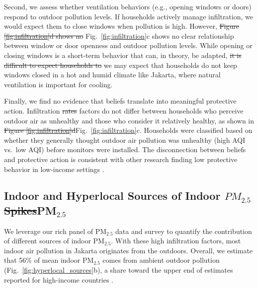 \documentclass[reqno,12pt,notitlepage]{article}
\providecommand{\DIFadd}[1]{{\protect\color{BLUE}#1}} %
\providecommand{\DIFdel}[1]{{\protect\color{red}\sout{#1}}} %
\providecommand{\DIFaddbegin}{} %
\providecommand{\DIFaddend}{} %
\providecommand{\DIFdelbegin}{} %
\providecommand{\DIFdelend}{} %
\begin{document}
Second, we assess whether ventilation behaviors (e.g., opening windows or doors) respond to outdoor pollution levels. If households actively manage infiltration, we would expect them to close windows when pollution is high. However, \DIFdelbegin \DIFdel{Figure \ref{fig:infiltration}d shows no }\DIFdelend \DIFaddbegin \DIFadd{Fig.\ \ref{fig:infiltration}c shows no clear }\DIFaddend relationship between window or door openness and outdoor pollution levels. While opening or closing windows is a short-term behavior that can, in theory, be adapted, \DIFdelbegin \DIFdel{it is difficult to expect households to }\DIFdelend \DIFaddbegin \DIFadd{we may expect that households do not }\DIFaddend keep windows closed in a hot and humid climate like Jakarta, where natural ventilation is important for cooling. 

Finally, we find no evidence that beliefs translate into meaningful protective action. Infiltration \DIFdelbegin \DIFdel{rates }\DIFdelend \DIFaddbegin \DIFadd{factors }\DIFaddend do not differ between households who perceive outdoor air as unhealthy and those who consider it relatively healthy, as shown in \DIFdelbegin \DIFdel{Figure \ref{fig:infiltration}d}\DIFdelend \DIFaddbegin \DIFadd{Fig.\ \ref{fig:infiltration}c}\DIFaddend . Households were classified based on whether they generally thought outdoor air pollution was unhealthy (high AQI vs.\ low AQI) before monitors were installed. The disconnection between beliefs and protective action is consistent with other research finding low protective behavior in low-income settings \citep{greenstone_indoor_2021, chowdhury_misbeliefs_2025}.



\subsection{\DIFaddbegin \DIFadd{Indoor and }\DIFaddend Hyperlocal Sources of Indoor \DIFdelbegin \DIFdel{$PM_{2.5}$ Spikes}\DIFdelend \DIFaddbegin \DIFadd{PM$_{2.5}$}\DIFaddend }

\DIFaddbegin \DIFadd{We leverage our rich panel of PM$_{2.5}$ data and survey to quantify the contribution of different sources of indoor PM$_{2.5}$. With these high infiltration factors, most indoor air pollution in Jakarta originates from the outdoors. Overall, we estimate that 56\% of mean indoor PM$_{2.5}$ comes from ambient outdoor pollution (Fig.\ \ref{fig:hyperlocal_sources}b), a share toward the upper end of estimates reported for high-income countries \citep{lunderberg_assessing_2023}.
}
\end{document}
